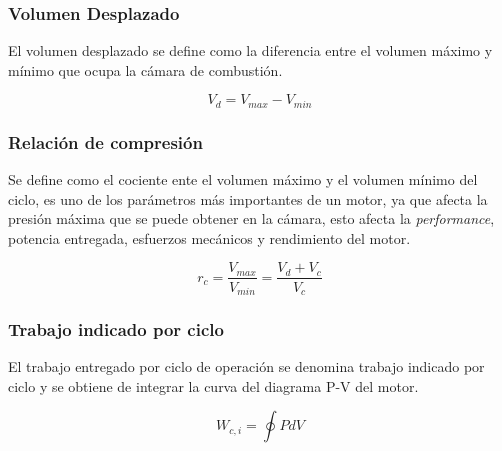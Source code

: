 \subsubsection{Volumen Desplazado}
%
El volumen desplazado se define como la diferencia entre el volumen máximo y
mínimo que ocupa la cámara de combustión.

\begin{equation}\label{eq:vol_desp}
    V_d = V_{max}-V_{min}
\end{equation}



\subsubsection{Relación de compresión}

Se define como el cociente ente el volumen máximo y el volumen mínimo del
ciclo, es uno de los parámetros más importantes de un motor, ya que afecta la
presión máxima que se puede obtener en la cámara, esto afecta la
\emph{performance}, potencia entregada, esfuerzos mecánicos y rendimiento del
motor.

\begin{equation}\label{eq:rel_comp}
    r_c = \frac{V_{max}}{V_{min}} = \frac{V_d+V_c}{V_c}
\end{equation}




\subsubsection{Trabajo indicado por ciclo}
%
El trabajo entregado por ciclo de operación se denomina trabajo indicado por
ciclo y se obtiene de integrar la curva del diagrama P-V del motor.

\begin{equation}\label{eq:w_indicado}
    W_{c,i} = \oint P dV
\end{equation}

